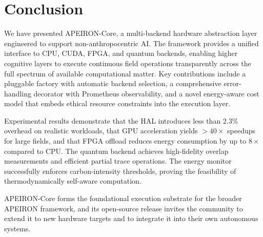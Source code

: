 \newpage
\section{Conclusion}

We have presented APEIRON-Core, a multi-backend hardware abstraction layer engineered to support non-anthropocentric AI. The framework provides a unified interface to CPU, CUDA, FPGA, and quantum backends, enabling higher cognitive layers to execute continuous field operations transparently across the full spectrum of available computational matter. Key contributions include a pluggable factory with automatic backend selection, a comprehensive error-handling decorator with Prometheus observability, and a novel energy-aware cost model that embeds ethical resource constraints into the execution layer.

Experimental results demonstrate that the HAL introduces less than 2.3\% overhead on realistic workloads, that GPU acceleration yields $>40\times$ speedups for large fields, and that FPGA offload reduces energy consumption by up to $8\times$ compared to CPU. The quantum backend achieves high-fidelity overlap measurements and efficient partial trace operations. The energy monitor successfully enforces carbon-intensity thresholds, proving the feasibility of thermodynamically self-aware computation.

APEIRON-Core forms the foundational execution substrate for the broader APEIRON framework, and its open-source release invites the community to extend it to new hardware targets and to integrate it into their own autonomous systems.